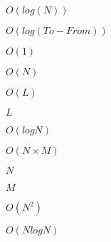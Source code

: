 \documentclass{article}
\begin{document}
$ O(log(N)) $
\pagebreak

$ O(log(To - From)) $
\pagebreak

$ O(1) $
\pagebreak

$ O(N) $
\pagebreak

$ O(L) $
\pagebreak

$ L $
\pagebreak

$ O(log N) $
\pagebreak

$ O(N \times M) $
\pagebreak

$ N $
\pagebreak

$ M $
\pagebreak

$ O(N^2) $
\pagebreak

$ O(N log N) $
\pagebreak
\end{document}
